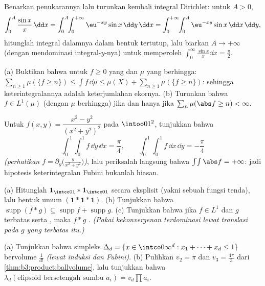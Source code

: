 \begin{exercise}[$\star$]\label{exo:b3:product:2}
Benarkan penukarannya lalu turunkan kembali integral Dirichlet: untuk
$A > 0$,
\[
\int_0^A\frac{\sin x}x\,\dd x
= \int_0^A\!\!\int_0^{+\infty}\eu^{-xy}\sin x\,\dd y\,\dd x
= \int_0^{+\infty}\!\!\int_0^A \eu^{-xy}\sin x\,\dd x\,\dd y,
\]
hitunglah integral dalamnya dalam bentuk tertutup, lalu biarkan $A \to
+\infty$ (dengan mendominasi integral-$y$-nya) untuk memperoleh
$\int_0^\infty\frac{\sin x}x\dd x = \frac\pi2$.
\end{exercise}

\begin{exercise}[$\star\star$]\label{exo:b3:product:3}
(a) Buktikan bahwa untuk $f \geq 0$ yang  dan $\mu$ yang berhingga:
$\sum_{n\geq1}\mu(\{f \geq n\}) \leq \int f\,\dd\mu \leq
\mu(X) + \sum_{n\geq1}\mu(\{f\geq n\})$: sehingga keterintegralannya adalah
keterjumlahan  ekornya.
(b) Turunkan bahwa $f \in L^1(\mu)$ (dengan $\mu$ berhingga) jika dan hanya jika
$\sum_n\mu(\abs f \geq n) < \infty$.
\end{exercise}

\begin{exercise}[$\star\star$]\label{exo:b3:product:4}
Untuk $f(x, y) = \dfrac{x^2 - y^2}{(x^2 + y^2)^2}$ pada
$\intoo01^2$, tunjukkan bahwa
\[
\int_0^1\!\!\int_0^1 f\,\dd y\,\dd x = \frac\pi4,
\qquad
\int_0^1\!\!\int_0^1 f\,\dd x\,\dd y = -\frac\pi4
\]
\emph{(perhatikan $f = \partial_y\bigl(\frac{y}{x^2+y^2}\bigr)$)},
lalu periksalah langsung bahwa $\int\!\int\abs f = +\infty$: jadi hipotesis
keterintegralan Fubini bukanlah hiasan.
\end{exercise}

\begin{exercise}[$\star\star$]\label{exo:b3:product:5}
(a) Hitunglah $\mathbf 1_{\intcc01} * \mathbf 1_{\intcc01}$
secara eksplisit (yakni sebuah fungsi tenda), lalu bentuk umum $(\mathbf 1 * \mathbf 1 *
\mathbf 1)$.
(b) Tunjukkan bahwa $\operatorname{supp}(f * g) \subseteq
\overline{\operatorname{supp}f + \operatorname{supp}g}$.
(c) Tunjukkan bahwa jika $f \in L^1$ dan $g$ terbatas serta , maka
$f * g$ . \emph{(Pakai kekonvergenan terdominasi lewat 
translasi pada $g$ yang terbatas itu.)}
\end{exercise}

\begin{exercise}[$\star\star$]\label{exo:b3:product:6}
(a) Tunjukkan bahwa simpleks $\Delta_d = \{x \in \intco0\infty^d
: x_1 + \dots + x_d \leq 1\}$ bervolume $\frac1{d!}$
\emph{(lewat induksi dan Fubini)}.
(b) Pulihkan $v_2 = \pi$ dan $v_3 = \frac{4\pi}3$ dari
\cref{thm:b3:product:ballvolume}, lalu tunjukkan bahwa
$\lambda_d(\text{elipsoid bersetengah sumbu } a_i) =
v_d\prod a_i$.
\end{exercise}

